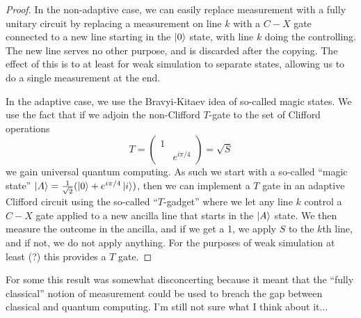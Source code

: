\documentclass{article}
\theoremstyle{definition}
\begin{document}
\begin{proof}
  In the non-adaptive case, we can easily replace measurement with a fully
  unitary circuit by replacing a measurement on line $k$ with a $C-X$ gate
  connected to a new line starting in the $\ket{0}$ state, with line $k$ doing
  the controlling. The new line serves no other purpose, and is discarded after
  the copying. The effect of this is to at least for weak simulation to separate
  states, allowing us to do a single measurement at the end.

  In the adaptive case, we use the Bravyi-Kitaev idea of so-called magic states.
  We use the fact that if we adjoin the non-Clifford $T$-gate to the set of
  Clifford operations
  $$ T =
  \begin{pmatrix}
    1 & \\
    & e^{i\pi / 4}
  \end{pmatrix} = \sqrt{S} $$
  we gain universal quantum computing. As such we start with a so-called ``magic
  state'' $\ket{A} = \frac{1}{\sqrt{2}} (\ket{0} + e^{i \pi / 4}\ket{i})$, then
  we can implement a $T$ gate in an adaptive Clifford circuit using the
  so-called ``$T$-gadget'' where we let any line $k$ control a $C-X$ gate
  applied to a new ancilla line that starts in the $\ket{A}$ state. We then
  measure the outcome in the ancilla, and if we get a 1, we apply $S$ to the
  $k$th line, and if not, we do not apply anything. For the purposes of weak
  simulation at least (?) this provides a $T$ gate.
\end{proof}

For some this result was somewhat disconcerting because it meant that the
``fully classical'' notion of measurement could be used to breach the gap
between classical and quantum computing. I'm still not sure what I think about
it...
\end{document}
